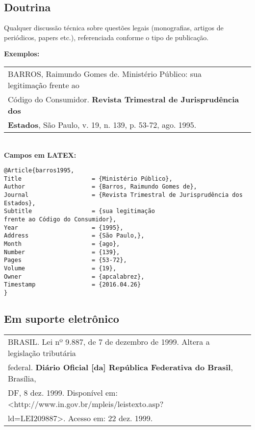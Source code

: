 \subsection{Doutrina}

Qualquer discussão técnica sobre questões legais (monografias, artigos
de periódicos, papers etc.), referenciada conforme o tipo de publicação. 

\textbf{Exemplos:} \\

\begin{tabular}{|l|c|} \hline
BARROS, Raimundo Gomes de. Ministério Público: sua legitimação	frente ao\\
Código do Consumidor. \textbf{Revista Trimestral de Jurisprudência dos}\\
\textbf{Estados}, São Paulo, v. 19, n. 139, p. 53-72, ago. 1995. \\\hline
\end{tabular} \\

\textbf{Campos em LATEX:} 

\begin{verbatim}
@Article{barros1995,
Title                    = {Ministério Público},
Author                   = {Barros, Raimundo Gomes de},
Journal                  = {Revista Trimestral de Jurisprudência dos 
Estados},
Subtitle                 = {sua legitimação
frente ao Código do Consumidor},
Year                     = {1995},
Address                  = {São Paulo,},
Month                    = {ago},
Number                   = {139},
Pages                    = {53-72},
Volume                   = {19},
Owner                    = {apcalabrez},
Timestamp                = {2016.04.26}
}
\end{verbatim}
\subsection{Em suporte eletrônico}

\begin{tabular}{|l|c|} \hline
BRASIL. Lei nº 9.887, de 7 de dezembro de 1999. Altera a legislação tributária\\
federal. \textbf{Diário Oficial [da] República Federativa do Brasil}, Brasília,\\
DF, 8 dez. 1999. Disponível em: <http://www.in.gov.br/mpleis/leistexto.asp?\\
ld=LEI209887>. Acesso em: 22 dez. 1999. 
\\\hline
\end{tabular} \\

